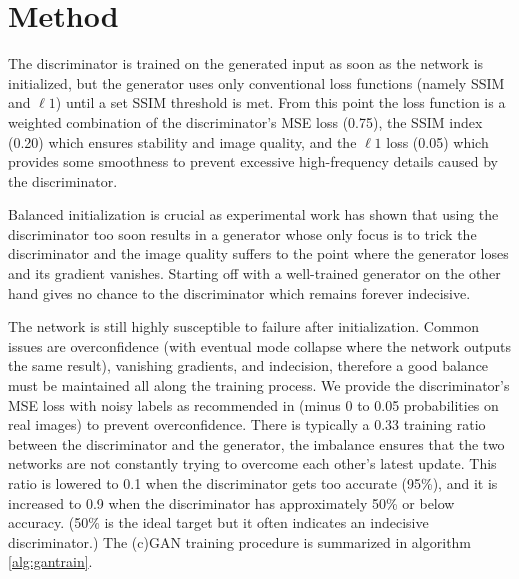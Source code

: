 \section{Method}
The discriminator is trained on the generated input as soon as the network is initialized, but the generator uses only conventional loss functions (namely \ac{SSIM} and $\ell 1$) until a set \ac{SSIM} threshold is met. From this point the loss function is a weighted combination of the discriminator's \ac{MSE} loss (0.75), the \ac{SSIM} index (0.20) which ensures stability and image quality, and the $\ell 1$ loss (0.05) which provides some smoothness to prevent excessive high-frequency details caused by the discriminator. 

Balanced initialization is crucial as experimental work has shown that using the discriminator too soon results in a generator whose only focus is to trick the discriminator and the image quality suffers to the point where the generator loses and its gradient vanishes. Starting off with a well-trained generator on the other hand gives no chance to the discriminator which remains forever indecisive.

The network is still highly susceptible to failure after initialization. Common issues are overconfidence (with eventual mode collapse where the network outputs the same result), vanishing gradients, and indecision, therefore a good balance must be maintained all along the training process. We provide the discriminator's \ac{MSE} loss with noisy labels as recommended in \cite{gantechniques}\cite{gantutorial} (minus 0 to 0.05 probabilities on real images) to prevent overconfidence. There is typically a 0.33 training ratio between the discriminator and the generator, the imbalance ensures that the two networks are not constantly trying to overcome each other's latest update. This ratio is lowered to 0.1 when the discriminator gets too accurate (95\%), and it is increased to 0.9 when the discriminator has approximately 50\% or below accuracy. (50\% is the ideal target but it often indicates an indecisive discriminator.)
The (c)GAN training procedure is summarized in algorithm \ref{alg:gantrain}.

